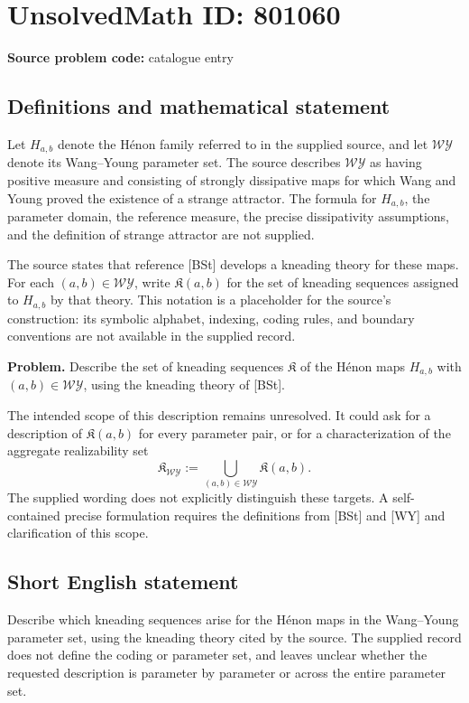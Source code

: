 \documentclass[11pt]{article}
\begin{document}
\section*{UnsolvedMath ID: 801060}
\textbf{Source problem code:} catalogue entry
\subsection{Definitions and mathematical statement}
Let \(H_{a,b}\) denote the H\'enon family referred to in the supplied source, and let \(\mathcal{WY}\) denote its Wang--Young parameter set. The source describes \(\mathcal{WY}\) as having positive measure and consisting of strongly dissipative maps for which Wang and Young proved the existence of a strange attractor. The formula for \(H_{a,b}\), the parameter domain, the reference measure, the precise dissipativity assumptions, and the definition of strange attractor are not supplied.

The source states that reference [BSt] develops a kneading theory for these maps. For each \((a,b)\in\mathcal{WY}\), write \(\mathfrak K(a,b)\) for the set of kneading sequences assigned to \(H_{a,b}\) by that theory. This notation is a placeholder for the source's construction: its symbolic alphabet, indexing, coding rules, and boundary conventions are not available in the supplied record.

\textbf{Problem.} Describe the set of kneading sequences \(\mathfrak K\) of the H\'enon maps \(H_{a,b}\) with \((a,b)\in\mathcal{WY}\), using the kneading theory of [BSt].

The intended scope of this description remains unresolved. It could ask for a description of \(\mathfrak K(a,b)\) for every parameter pair, or for a characterization of the aggregate realizability set
\[
\mathfrak K_{\mathcal{WY}}
:=\bigcup_{(a,b)\in\mathcal{WY}}\mathfrak K(a,b).
\]
The supplied wording does not explicitly distinguish these targets. A self-contained precise formulation requires the definitions from [BSt] and [WY] and clarification of this scope.
\subsection{Short English statement}
Describe which kneading sequences arise for the H\'enon maps in the Wang--Young parameter set, using the kneading theory cited by the source. The supplied record does not define the coding or parameter set, and leaves unclear whether the requested description is parameter by parameter or across the entire parameter set.
\end{document}
